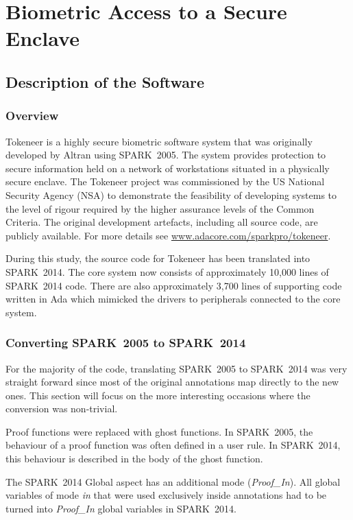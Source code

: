 \documentclass[10pt,a4paper,twocolumn]{article}
\newcommand{\oldspark}{SPARK~2005\xspace}
\newcommand{\newspark}{SPARK~2014\xspace}
\begin{document}
\section{Biometric Access to a Secure Enclave}


\subsection{Description of the Software}

\subsubsection{Overview}

Tokeneer is a highly secure biometric software system that was
originally developed by Altran using \oldspark. The system provides
protection to secure information held on a network of workstations
situated in a physically secure enclave. The Tokeneer project was
commissioned by the US National Security Agency (NSA) to demonstrate
the feasibility of developing systems to the level of rigour required
by the higher assurance levels of the Common Criteria. The original
development artefacts, including all source code, are publicly
available. For more details see
\url{www.adacore.com/sparkpro/tokeneer}.

During this study, the source code for Tokeneer has been translated
into \newspark. The core system now consists of approximately
10,000 lines of \newspark code. There
are also approximately 3,700 lines of supporting code written in Ada
which mimicked the drivers to peripherals connected to the core
system.

\subsubsection{Converting \oldspark to \newspark}

For the majority of the code, translating \oldspark to \newspark was
very straight forward since most of the original annotations map
directly to the new ones. This section will focus on the more
interesting occasions where the conversion was non-trivial.

Proof functions were replaced with ghost functions. In \oldspark, the
behaviour of a proof function was often defined in a user rule. In
\newspark, this behaviour is described in the body of the ghost
function.

The \newspark Global aspect has an additional mode
(\emph{Proof\_In}). All global variables of mode \emph{in} that were
used exclusively inside annotations had to be turned into
\emph{Proof\_In} global variables in \newspark.
\end{document}
